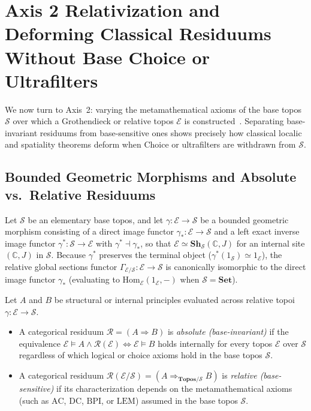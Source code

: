 \section{Axis 2 Relativization and Deforming Classical Residuums Without Base Choice or Ultrafilters}

We now turn to Axis~2: varying the metamathematical axioms of the base topos $\mathcal{S}$ over which a Grothendieck or relative topos $\mathcal{E}$ is constructed~\cite{Johnstone02,MacLaneMoerdijk92}. Separating base-invariant residuums from base-sensitive ones shows precisely how classical localic and spatiality theorems deform when Choice or ultrafilters are withdrawn from $\mathcal{S}$.

\subsection{Bounded Geometric Morphisms and Absolute vs.\ Relative Residuums}

Let $\mathcal{S}$ be an elementary base topos, and let $\gamma: \mathcal{E} \to \mathcal{S}$ be a bounded geometric morphism consisting of a direct image functor $\gamma_*: \mathcal{E} \to \mathcal{S}$ and a left exact inverse image functor $\gamma^*: \mathcal{S} \to \mathcal{E}$ with $\gamma^* \dashv \gamma_*$, so that $\mathcal{E} \simeq \mathbf{Sh}_{\mathcal{S}}(\mathbb{C}, J)$ for an internal site $(\mathbb{C}, J)$ in $\mathcal{S}$. Because $\gamma^*$ preserves the terminal object ($\gamma^*(1_{\mathcal{S}}) \simeq 1_{\mathcal{E}}$), the relative global sections functor $\Gamma_{\mathcal{E}/\mathcal{S}}: \mathcal{E} \to \mathcal{S}$ is canonically isomorphic to the direct image functor $\gamma_*$ (evaluating to $\mathrm{Hom}_{\mathcal{E}}(1_{\mathcal{E}}, -)$ when $\mathcal{S} = \mathbf{Set}$).

\begin{definition}\label{def:abs-rel-residuum}

Let $A$ and $B$ be structural or internal principles evaluated across relative topoi $\gamma: \mathcal{E} \to \mathcal{S}$.

\begin{itemize}

  \item A categorical residuum $\mathcal{R} = (A \Rightarrow B)$ is \emph{absolute (base-invariant)} if the equivalence $\mathcal{E} \models A \wedge \mathcal{R}(\mathcal{E}) \iff \mathcal{E} \models B$ holds internally for every topos $\mathcal{E}$ over $\mathcal{S}$ regardless of which logical or choice axioms hold in the base topos $\mathcal{S}$.

  \item A categorical residuum $\mathcal{R}(\mathcal{E}/\mathcal{S}) = (A \Rightarrow_{\mathbf{Topos}/\mathcal{S}} B)$ is \emph{relative (base-sensitive)} if its characterization depends on the metamathematical axioms (such as $\mathrm{AC}$, $\mathrm{DC}$, $\mathrm{BPI}$, or $\mathrm{LEM}$) assumed in the base topos $\mathcal{S}$.

\end{itemize}

\end{definition}


